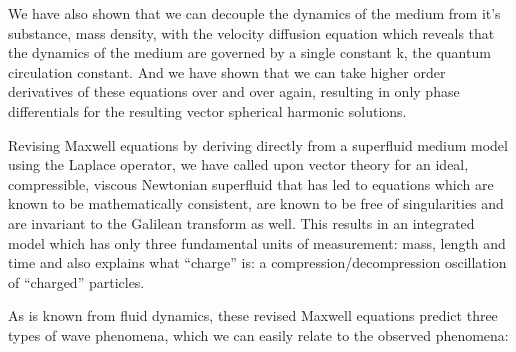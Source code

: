 \documentclass{article}
\begin{document}
We have also shown that we can decouple the dynamics of the medium from it's substance, mass density, with the velocity
diffusion equation which reveals that the dynamics of the medium are governed by a single constant k, the quantum
circulation constant. And we have shown that we can take higher order derivatives of these equations over and over
again, resulting in only phase differentials for the resulting vector spherical harmonic solutions.

Revising Maxwell equations by deriving directly from a superfluid medium model using the Laplace operator, we have
called upon vector theory for an ideal, compressible, viscous Newtonian superfluid that has led to equations which are
known to be mathematically consistent, are known to be free of singularities and are invariant to the Galilean
transform as well. This results in an integrated model which has only three fundamental units of measurement: mass,
length and time and also explains what ``charge'' is: a compression/decompression oscillation of ``charged'' particles.


As is known from fluid dynamics, these revised Maxwell equations predict three types of wave phenomena, which we can
easily relate to the observed phenomena:
\end{document}
